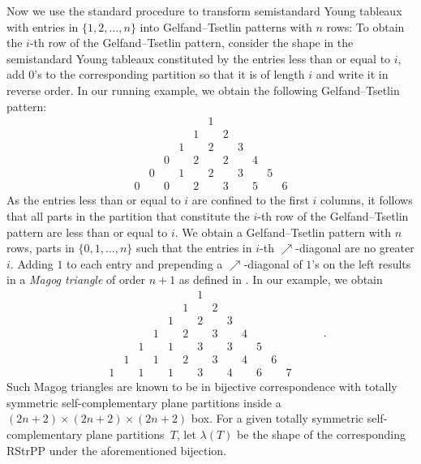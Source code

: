\documentclass[12pt]{amsart}
\theoremstyle{definition}
\numberwithin{equation}{section}
\newcommand{\RSPP}{RStrPP\xspace}
\begin{document}
Now we use the standard procedure to transform semistandard Young tableaux with entries in $\{1,2,\ldots,n\}$ into Gelfand--Tsetlin patterns with $n$ rows: 
To obtain the $i$-th row of the Gelfand--Tsetlin pattern, consider the shape in the semistandard Young tableaux constituted by the entries less than or 
equal to $i$, add $0$'s to the corresponding partition so that it is of length $i$ and write it in reverse order. In our running example, we obtain the following Gelfand--Tsetlin pattern:
\[
\begin{array}{ccccccccccccccccc}
  &   &   &   &   &   &   &   & 1 &   &   &   &   &   &   &   & \\
  &   &   &   &   &   &   & 1 &   & 2 &   &   &   &   &   &   & \\
  &   &   &   &   &   &1 &   & 2 &   & 3 &   &   &   &   &   & \\
  &   &   &   &   & 0 &   & 2 &   & 2 &   & 4 &   &   &   &   & \\
  &   &   &   & 0 &   & 1 &  &   2 &   & 3   &  & 5  &   &   &   & \\
  &   &   & 0 &   & 0 &   & 2 &   & 3 &   & 5 &   & 6 &   &   &
\end{array}
\]
As the entries less than or equal to $i$ are confined to the first $i$ columns, it follows that all parts in the partition that constitute the $i$-th row of the Gelfand--Tsetlin pattern are less than or equal to $i$. We obtain a Gelfand--Tsetlin pattern with $n$ rows, 
parts in $\{0,1,\ldots,n\}$ such that the entries in $i$-th $\nearrow$-diagonal are no greater $i$. Adding $1$ to each entry and prepending a 
$\nearrow$-diagonal of $1$'s on the left results in a \emph{Magog triangle} of order $n+1$ as defined in \cite{Zei96a,FischerGog}. In our example, we obtain 
\[
\begin{array}{ccccccccccccccccc}
  &   &   &   &   &   &   & 1  &  &   &   &   &   &   &   &   & \\
  &   &   &   &   &   & 1  &   & 2 &   &   &   &   &   &   &   & \\
  &   &   &   &   & 1  &   & 2 &   & 3 &   &   &   &   &   &   & \\
  &   &   &   & 1   &   &2 &   & 3 &   & 4 &   &   &   &   &   & \\
  &   &   & 1  &   & 1 &   & 3 &   & 3 &   & 5 &   &   &   &   & \\
  &   &1   &   & 1 &   & 2 &  &   3 &   & 4   &  & 6  &   &   &   & \\
  &1   &   & 1 &   & 1 &   & 3 &   & 4 &   & 6 &   & 7 &   &   &
\end{array}.
\]
Such Magog triangles are known to be in 
bijective correspondence with totally symmetric self-complementary plane partitions \cite{MilRobRum86} inside a $(2n+2) \times (2n+2) \times (2n+2)$ box. For a given totally symmetric self-complementary plane partitions~$T$, let $\lambda(T)$ be the shape of the corresponding \RSPP under the aforementioned bijection.
\end{document}
